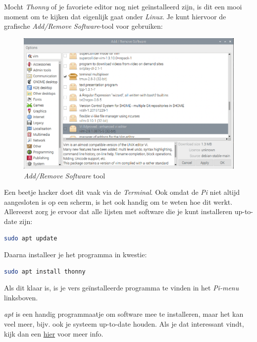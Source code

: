 Mocht \textit{Thonny} of je favoriete editor nog niet geïnstalleerd zijn, is dit een mooi moment om te kijken dat eigenlijk gaat onder \textit{Linux}. Je kunt hiervoor de grafische \textit{Add/Remove Software}-tool voor gebruiken:
\begin{figure}[h!]
\centering\includegraphics[scale=0.25]{Pictures/chapter05/add_remove_software.png}
\caption{\textit{Add/Remove Software} tool}
\label{fig:addremovesoftware} %
\end{figure}

\begin{remark}
Een beetje hacker doet dit vaak via de \textit{Terminal}. Ook omdat de \textit{Pi} niet altijd aangesloten is op een scherm, is het ook handig om te weten hoe dit werkt. Allereerst zorg je ervoor dat alle lijsten met software die je kunt installeren up-to-date zijn:
\begin{lstlisting}[language=bash]
sudo apt update
\end{lstlisting}

Daarna installeer je het programma in kwestie:
\begin{lstlisting}[language=bash]
sudo apt install thonny
\end{lstlisting}
Als dit klaar is, is je vers geïnstalleerde programma te vinden in het \textit{Pi-menu} linksboven.

\vspace{5mm}
\textit{apt} is een handig programmaatje om software mee te installeren, maar het kan veel meer, bijv. ook je systeem up-to-date houden. Als je dat interessant vindt, kijk dan een \href{https://ubuntu.com/server/docs/package-management}{hier} voor meer info. 
\end{remark}

